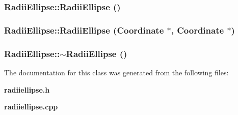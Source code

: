 \subsubsection{\setlength{\rightskip}{0pt plus 5cm}Radii\-Ellipse::Radii\-Ellipse ()}\label{classRadiiEllipse_a0}


\subsubsection{\setlength{\rightskip}{0pt plus 5cm}Radii\-Ellipse::Radii\-Ellipse ({\bf Coordinate} $\ast$, {\bf Coordinate} $\ast$)}\label{classRadiiEllipse_a1}


\subsubsection{\setlength{\rightskip}{0pt plus 5cm}Radii\-Ellipse::$\sim$Radii\-Ellipse ()}\label{classRadiiEllipse_a2}




The documentation for this class was generated from the following files:\begin{CompactItemize}
\item 
{\bf radiiellipse.h}\item 
{\bf radiiellipse.cpp}\end{CompactItemize}
